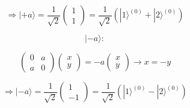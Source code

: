 \[\Rightarrow |+a\rangle = \frac{1}{\sqrt{2}} \begin{pmatrix}1\\1\end{pmatrix} = \frac{1}{\sqrt{2}} (|1\rangle^{(0)}+ |2\rangle^{(0)}) \]


\[|-a\rangle :\]

\[\begin{pmatrix}0&a\\a&0\end{pmatrix} \begin{pmatrix}x\\y\end{pmatrix}=-a\begin{pmatrix}x\\y\end{pmatrix} \rightarrow x=-y\]

\[\Rightarrow |-a\rangle = \frac{1}{\sqrt{2}} \begin{pmatrix}1\\-1\end{pmatrix} = \frac{1}{\sqrt{2}} (|1\rangle^{(0)}- |2\rangle^{(0)})  \]






